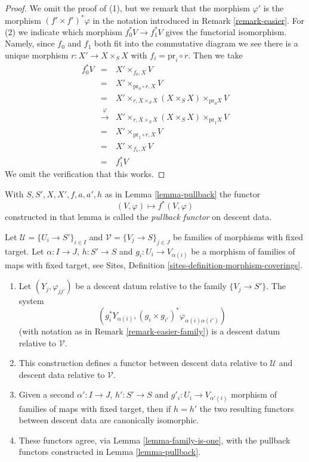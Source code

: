 \begin{proof}
We omit the proof of (1), but we remark that the morphism
$\varphi'$ is the morphism $(f' \times f')^*\varphi$ in the
notation introduced in Remark \ref{remark-easier}.
For (2) we indicate which morphism
$f_0^*V \to f_1^*V$ gives the functorial isomorphism. Namely,
since $f_0$ and $f_1$ both fit into the commutative diagram
we see there is a unique morphism $r : X' \to X \times_S X$
with $f_i = \text{pr}_i \circ r$. Then we take
\begin{eqnarray*}
f_0^*V & = &
X' \times_{f_0, X} V \\
& = &
X' \times_{\text{pr}_0 \circ r, X} V \\
& = &
X' \times_{r, X \times_S X} (X \times_S X) \times_{\text{pr}_0 X} V \\
& \xrightarrow{\varphi} &
X' \times_{r, X \times_S X} (X \times_S X) \times_{\text{pr}_1 X} V \\
& = &
X' \times_{\text{pr}_1 \circ r, X} V \\
& = &
X' \times_{f_1, X} V \\
& = & f_1^*V
\end{eqnarray*}
We omit the verification that this works.
\end{proof}

\begin{definition}
\label{definition-pullback-functor}
With $S, S', X, X', f, a, a', h$ as in Lemma \ref{lemma-pullback} the functor
$$
(V, \varphi) \longmapsto f^*(V, \varphi)
$$
constructed in that lemma is called the {\it pullback functor} on descent data.
\end{definition}

\begin{lemma}
\label{lemma-pullback-family}
Let $\mathcal{U} = \{U_i \to S'\}_{i \in I}$ and
$\mathcal{V} = \{V_j \to S\}_{j \in J}$ be families of morphisms with
fixed target. Let $\alpha : I \to J$, $h : S' \to S$ and
$g_i : U_i \to V_{\alpha(i)}$ be a morphism of families
of maps with fixed target, see
Sites, Definition \ref{sites-definition-morphism-coverings}.
\begin{enumerate}
\item Let $(Y_j, \varphi_{jj'})$ be a descent datum relative to the
family $\{V_j \to S'\}$. The system
$$
\left(
g_i^*Y_{\alpha(i)},
(g_i \times g_{i'})^*\varphi_{\alpha(i)\alpha(i')}
\right)
$$
(with notation as in Remark \ref{remark-easier-family})
is a descent datum relative to $\mathcal{V}$.
\item This construction defines a functor between descent data relative
to $\mathcal{U}$ and descent data relative to $\mathcal{V}$.
\item Given a second $\alpha' : I \to J$, $h' : S' \to S$ and
$g'_i : U_i \to V_{\alpha'(i)}$ morphism of families
of maps with fixed target, then if $h = h'$ the two resulting functors
between descent data are canonically isomorphic.
\item These functors agree, via Lemma \ref{lemma-family-is-one},
with the pullback functors constructed in Lemma \ref{lemma-pullback}.
\end{enumerate}
\end{lemma}

